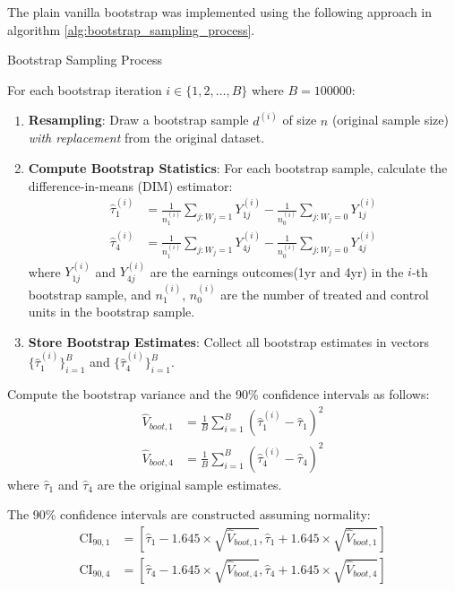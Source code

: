 \documentclass[11pt]{article}
\numberwithin{equation}{section}
\begin{document}
The plain vanilla bootstrap was implemented using the following approach in algorithm \ref{alg:bootstrap_sampling_process}.


\begin{algorithm}
    \caption{Bootstrap Sampling Process}
    \label{alg:bootstrap_sampling_process}
    For each bootstrap iteration $i \in \{1, 2, \ldots, B\}$ where $B = 100000$:
    \begin{enumerate}
    \item \textbf{Resampling}: Draw a bootstrap sample $d^{(i)}$ of size $n$ (original sample size) \textit{with replacement} from the original dataset. 
    
    \item \textbf{Compute Bootstrap Statistics}: For each bootstrap sample, calculate the difference-in-means (DIM) estimator:
    \begin{align}
        \hat{\tau}^{(i)}_1 &= \frac{1}{n^{(i)}_1} \sum_{j: W_j = 1} Y_{1j}^{(i)} - \frac{1}{n^{(i)}_0} \sum_{j: W_j = 0} Y_{1j}^{(i)} \\
        \hat{\tau}^{(i)}_4 &= \frac{1}{n^{(i)}_1} \sum_{j: W_j = 1} Y_{4j}^{(i)} - \frac{1}{n^{(i)}_0} \sum_{j: W_j = 0} Y_{4j}^{(i)}
    \end{align}
    where $Y_{1j}^{(i)}$ and $Y_{4j}^{(i)}$ are the earnings outcomes(1yr and 4yr) in the $i$-th bootstrap sample, and $n^{(i)}_1$, $n^{(i)}_0$ are the number of treated and control units in the bootstrap sample.
    
    \item \textbf{Store Bootstrap Estimates}: Collect all bootstrap estimates in vectors $\{\hat{\tau}^{(i)}_1\}_{i=1}^B$ and $\{\hat{\tau}^{(i)}_4\}_{i=1}^B$.
\end{enumerate}

Compute the bootstrap variance and the 90\% confidence intervals as follows:
\begin{align}
    \hat{V}_{boot,1} &= \frac{1}{B} \sum_{i=1}^B \left(\hat{\tau}^{(i)}_1 - \hat{\tau}_1\right)^2 \\
    \hat{V}_{boot,4} &= \frac{1}{B} \sum_{i=1}^B \left(\hat{\tau}^{(i)}_4 - \hat{\tau}_4\right)^2
\end{align}
where $\hat{\tau}_1$ and $\hat{\tau}_4$ are the original sample estimates.

The 90\% confidence intervals are constructed assuming normality:
\begin{align}
    \text{CI}_{90,1} &= \left[\hat{\tau}_1 - 1.645 \times \sqrt{\hat{V}_{boot,1}}, \hat{\tau}_1 + 1.645 \times \sqrt{\hat{V}_{boot,1}}\right] \\
    \text{CI}_{90,4} &= \left[\hat{\tau}_4 - 1.645 \times \sqrt{\hat{V}_{boot,4}}, \hat{\tau}_4 + 1.645 \times \sqrt{\hat{V}_{boot,4}}\right]
\end{align}
\end{algorithm}
\end{document}
